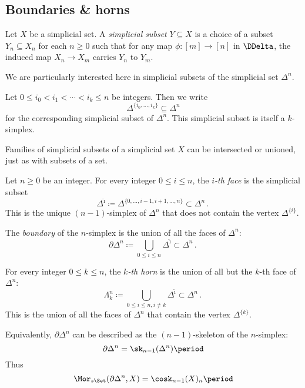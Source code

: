 
\subsection{Boundaries \& horns}%
\label{sub:boundariesandhorns}

\begin{definition}
  Let $X$ be a simplicial set.
  A \emph{simplicial subset} $Y \subseteq X$ is a choice of a subset $Y_n \subseteq X_n$ for each $n \geq 0$ such that for any map $\phi \colon [m] \to [n]$ in $\DDelta$, the induced map $X_n \to X_m$ carries $Y_n$ to $Y_m$.
\end{definition}

\noindent We are particularly interested here in simplicial subsets of the simplicial set $\Delta^n$.

\begin{notation}
  Let $0 \leq i_0 < i_1 < \cdots < i_k \leq n$ be integers.
  Then we write
  \[
    \Delta^{\{i_0, \dots, i_k\}} \subseteq \Delta^n
  \]
  for the corresponding simplicial subset of $\Delta^n$.
  This simplicial subset is itself a $k$-simplex.
\end{notation}

Families of simplicial subsets of a simplicial set $X$ can be intersected or unioned, just as with subsets of a set.

\begin{definition}
  Let $n \geq 0$ be an integer.
  For every integer $0 \leq i \leq n$, the \emph{$i$-th face} is the simplicial subset 
  \[
    \Delta^{\hat{\imath}} \coloneq \Delta^{\{0,\dots,i-1,i+1,\dots,n\}} \subset \Delta^n \period
  \]
  This is the unique $(n-1)$-simplex of $\Delta^n$ that does not contain the vertex $\Delta^{\{i\}}$.

  The \emph{boundary} of the $n$-simplex is the union of all the faces of $\Delta^n$:
  \[
    \partial \Delta^n \coloneq \bigcup_{0 \leq i \leq n} \Delta^{\hat{\imath}} \subset \Delta^n \period
  \]

  For every integer $0 \leq k \leq n$, the \emph{$k$-th horn} is the union of all but the $k$-th face of $\Delta^n$:
  \[
    \Lambda^n_k \coloneq \bigcup_{0 \leq i \leq n, i \neq k} \Delta^{\hat{\imath}} \subset \Delta^n \period
  \]
  This is the union of all the faces of $\Delta^n$ that contain the vertex $\Delta^{\{k\}}$. 
\end{definition}

Equivalently, $\partial \Delta^n$ can be described as the $(n-1)$-skeleton of the $n$-simplex:
\[
  \partial \Delta^n = \sk_{n-1}(\Delta^n) \period
\]
Thus
\[
  \Mor_{s\Set}(\partial\Delta^n, X) = \cosk_{n-1}(X)_n \period
\]


